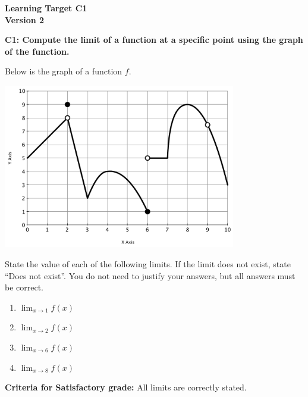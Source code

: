 \documentclass[10pt]{article}
\begin{document}
	\vspace*{0in}

		\begin{center}
			\textbf{Learning Target C1 \\
			Version 2} \\
		\end{center}


\begin{framed}
	\textbf{C1: Compute the limit of a function at a specific point using the graph of the function. }
\end{framed}

Below is the graph of a function $f$. 
\begin{center}
    \includegraphics[width=4in]{a1-plot1.pdf}
\end{center}
State the value of each of the following limits. If the limit does not exist, state ``Does not exist''. You do not need to justify your answers, but all answers must be correct. 

\begin{enumerate}
    \item $\displaystyle{\lim_{x \to 1} f(x)}$
    \item $\displaystyle{\lim_{x \to 2} f(x)}$
    \item $\displaystyle{\lim_{x \to 6} f(x)}$
    \item $\displaystyle{\lim_{x \to 8} f(x)}$
\end{enumerate}


\vfill


\begin{small}
    \begin{framed}
        	\textbf{Criteria for Satisfactory grade:} All limits are correctly stated.
    \end{framed}

\end{small}
\end{document}
